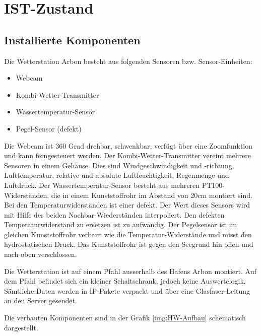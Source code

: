 \section{IST-Zustand}

\subsection{Installierte Komponenten}

Die Wetterstation Arbon besteht aus folgenden Sensoren bzw. Sensor-Einheiten:
\begin{itemize}  
\item Webcam
\item Kombi-Wetter-Transmitter
\item Wassertemperatur-Sensor
\item Pegel-Sensor (defekt)
\end{itemize}


Die Webcam ist 360 Grad drehbar, schwenkbar, verfügt über eine Zoomfunktion und kann ferngesteuert werden.  Der Kombi-Wetter-Transmitter vereint mehrere Sensoren in einem Gehäuse. Dies sind Windgeschwindigkeit und -richtung, Lufttemperatur, relative und absolute Luftfeuchtigkeit, Regenmenge und Luftdruck. Der Wassertemperatur-Sensor besteht aus mehreren PT100-Widerständen, die in einem Kunststoffrohr im Abstand von 20cm montiert sind. Bei den Temperaturwiderständen ist einer defekt. Der Wert dieses Sensors wird mit Hilfe der beiden Nachbar-Wiederständen interpoliert. Den defekten Temperaturwiderstand zu ersetzen ist zu aufwändig. Der Pegelsensor ist im gleichen Kunststoffrohr verbaut wie die Temperatur-Widerstände und misst den hydrostatischen Druck. Das Kunststoffrohr ist gegen den Seegrund hin offen und nach oben verschlossen.

Die Wetterstation ist auf einem Pfahl ausserhalb des Hafens Arbon montiert. Auf dem Pfahl befindet sich ein kleiner Schaltschrank, jedoch keine Auswertelogik. Sämtliche Daten werden in IP-Pakete verpackt und über eine Glasfaser-Leitung an den Server gesendet.

Die verbauten Komponenten sind in der Grafik \ref{img:HW-Aufbau} schematisch dargestellt.

